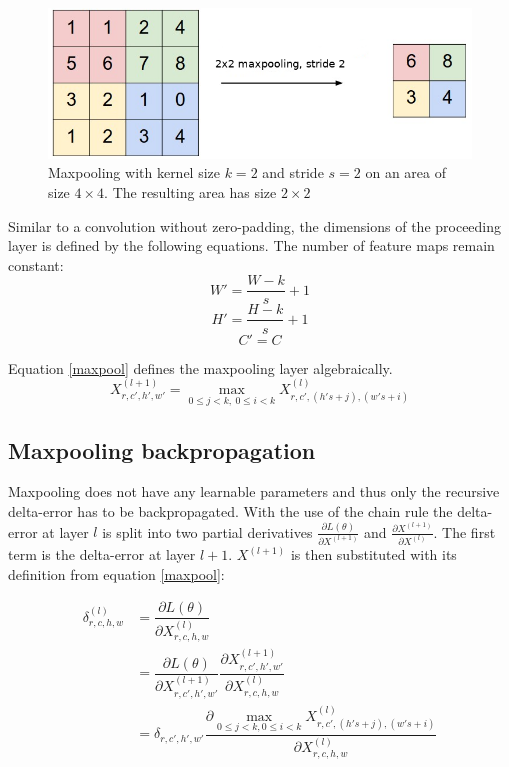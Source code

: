 \documentclass[a4paper, twoside]{article}
\newcommand*{\pd}[2]{\ensuremath{\dfrac{\partial #1}{\partial #2}}}
\newcommand*{\inpd}[2]{\ensuremath{\frac{\partial #1}{\partial #2}}}
\begin{document}
\begin{figure}[h]
	\centering
  		\includegraphics[scale=0.7]{maxpool.png}
  	\caption{Maxpooling with kernel size $k=2$ and stride $s=2$ on an area of size $4 \times 4$. The resulting area has size $2 \times 2$ \cite{figkonv}} \label{figmaxpool}
\end{figure}

Similar to a convolution without zero-padding, the dimensions of the proceeding layer is defined by the following equations. The number of feature maps remain constant: \cite{cs231n} \cite{convmath} \cite{convarithmetic}
\begin{equation}
W' = \frac{W-k}{s}+1
\end{equation}
\begin{equation}
H' = \frac{H-k}{s}+1
\end{equation}
\begin{equation}
C' = C
\end{equation}

Equation \eqref{maxpool} defines the maxpooling layer algebraically. \cite{cs231n} \cite{convmath}
\begin{equation}\label{maxpool}
X^{(l+1)}_{r,c',h',w'} = \underset{0 \leq j < k, \ 0 \leq i < k}{\max} X^{(l)}_{r,c',(h's+j),(w's+i)}
\end{equation}

\subsection{Maxpooling backpropagation}
Maxpooling does not have any learnable parameters and thus only the recursive delta-error has to be backpropagated. With the use of the chain rule the delta-error at layer $l$ is split into two partial derivatives $\inpd{L(\theta)}{X^{(l+1)}}$ and $\inpd{X^{(l+1)}}{X^{(l)}}$. The first term is the delta-error at layer $l+1$. $X^{(l+1)}$ is then substituted with its definition from equation \eqref{maxpool}: \cite{cs231n} \cite{convmath} \cite{webconv3}

\begin{equation}
\begin{split}
	\delta^{(l)}_{r,c,h,w}
		& = \pd{L(\theta)}{X^{(l)}_{r,c,h,w}} \\
		& = \pd{L(\theta)}{X^{(l+1)}_{r,c',h',w'}} \pd{X^{(l+1)}_{r,c',h',w'}}{X^{(l)}_{r,c,h,w}} \\
		& = \delta_{r,c',h',w'} \pd{\underset{0 \leq j < k,0 \leq i < k}{\max} X^{(l)}_{r,c',(h's+j),(w's+i)}}{X^{(l)}_{r,c,h,w}} \\
\end{split}
\end{equation}
\end{document}
